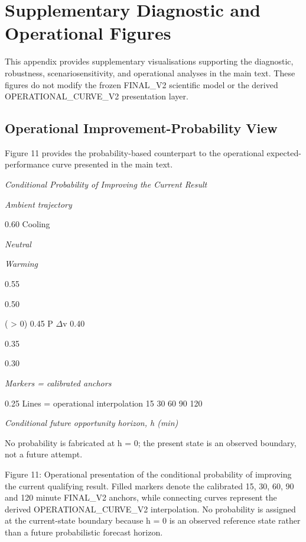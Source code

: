 \appendix
\section{Supplementary Diagnostic and Operational Figures}
This appendix provides supplementary visualisations supporting the diagnostic, robustness, scenariosensitivity, and operational analyses in the main text. These figures do not modify the frozen FINAL\_V2 scientific model or the derived OPERATIONAL\_CURVE\_V2 presentation layer.

\subsection{Operational Improvement-Probability View}
Figure 11 provides the probability-based counterpart to the operational expected-performance curve presented in the main text.

\begin{center}\textit{Conditional Probability of Improving the Current Result}\end{center}

\begin{center}\textit{Ambient trajectory}\end{center}

0.60 Cooling

\begin{center}\textit{Neutral}\end{center}

\begin{center}\textit{Warming}\end{center}

0.55

0.50

( > 0) 0.45 P \ensuremath{\Delta}v 0.40

0.35

0.30

\begin{center}\textit{Markers = calibrated anchors}\end{center}

0.25 Lines = operational interpolation 15 30 60 90 120

\begin{center}\textit{Conditional future opportunity horizon, h (min)}\end{center}

No probability is fabricated at h = 0; the present state is an observed boundary, not a future attempt.

Figure 11: Operational presentation of the conditional probability of improving the current qualifying result. Filled markers denote the calibrated 15, 30, 60, 90 and 120 minute FINAL\_V2 anchors, while connecting curves represent the derived OPERATIONAL\_CURVE\_V2 interpolation. No probability is assigned at the current-state boundary because h = 0 is an observed reference state rather than a future probabilistic forecast horizon.

